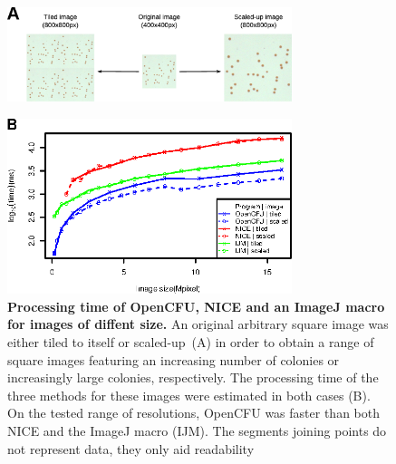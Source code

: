 \documentclass[10pt]{article}
\newcommand{\IJM}{IJM}
\begin{document}
\begin{figure}[!ht]

\begin{center}
\includegraphics[width=3.27in]{./figSpeed/fig2A.eps}\\
\end{center}
\begin{center}
\includegraphics[width=3.27in]{./figSpeed/fig2B.eps}
\end{center}
\caption{{\bf Processing time of OpenCFU, NICE\cite{clarke_lowcost_2010} and an ImageJ macro\cite{cai_optimized_2011} for images of
diffent size.} An original arbitrary square image was either tiled to itself
or scaled-up~(A) in order to obtain a range of square images featuring an
increasing number of colonies or increasingly large colonies, respectively. The
processing time of the three methods for these images were estimated in both cases (B).
On the tested range of resolutions, OpenCFU was faster than both NICE and the ImageJ macro (\IJM). 
The segments joining points do not represent data, they only aid readability}
\label{figSpeed}
\end{figure}


\newpage{}
\end{document}
